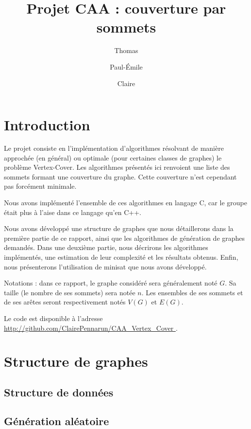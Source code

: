 \documentclass[a4paper,10pt]{article}
\title{Projet CAA : couverture par sommets}
\author{Thomas \bsc{Bellitto}\and Paul-Émile \bsc{Boutoille} \and Claire \bsc{Pennarun}}
\date{}
\begin{document}
\maketitle

\section*{Introduction}

Le projet consiste en l'implémentation d'algorithmes résolvant de manière approchée (en général) ou optimale (pour certaines classes de graphes) le problème Vertex-Cover.
Les algorithmes présentés ici renvoient une liste des sommets formant une couverture du graphe. Cette couverture n'est cependant pas forcément minimale.

Nous avons implémenté l'ensemble de ces algorithmes en langage C, car le groupe était plus à l'aise dans ce langage qu'en C++.

Nous avons développé une structure de graphes que nous détaillerons dans la première partie de ce rapport, ainsi que les algorithmes de génération de graphes demandés.
Dans une deuxième partie, nous décrirons les algorithmes implémentés, une estimation de leur complexité et les résultats obtenus.
Enfin, nous présenterons l'utilisation de minisat que nous avons développé.

Notations : dans ce rapport, le graphe considéré sera généralement noté $G$. Sa taille (le nombre de ses sommets) sera notée $n$. Les ensembles de ses sommets et de ses arêtes seront respectivement notés $V(G)$ et $E(G)$.

Le code est disponible à l'adresse \url{http://github.com/ClairePennarun/CAA_Vertex_Cover }.

\section{Structure de graphes}

\subsection{Structure de données}


\subsection{Génération aléatoire}
\end{document}
